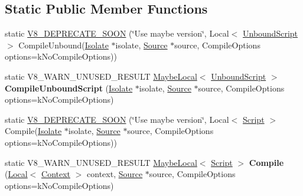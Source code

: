 \subsection*{Static Public Member Functions}
\begin{DoxyCompactItemize}
\item 
static \hyperlink{classv8_1_1_script_compiler_a092d08beb6c7c73e731197d0caf3abb3}{V8\+\_\+\+D\+E\+P\+R\+E\+C\+A\+T\+E\+\_\+\+S\+O\+O\+N} (\char`\"{}Use maybe version\char`\"{}, Local$<$ \hyperlink{classv8_1_1_unbound_script}{Unbound\+Script} $>$ Compile\+Unbound(\hyperlink{classv8_1_1_isolate}{Isolate} $\ast$isolate, \hyperlink{classv8_1_1_script_compiler_1_1_source}{Source} $\ast$source, Compile\+Options options=k\+No\+Compile\+Options))
\item 
\hypertarget{classv8_1_1_script_compiler_a4d3ed07e15d6ed5a5f569b44abc2cda9}{}static V8\+\_\+\+W\+A\+R\+N\+\_\+\+U\+N\+U\+S\+E\+D\+\_\+\+R\+E\+S\+U\+L\+T \hyperlink{classv8_1_1_maybe_local}{Maybe\+Local}$<$ \hyperlink{classv8_1_1_unbound_script}{Unbound\+Script} $>$ {\bfseries Compile\+Unbound\+Script} (\hyperlink{classv8_1_1_isolate}{Isolate} $\ast$isolate, \hyperlink{classv8_1_1_script_compiler_1_1_source}{Source} $\ast$source, Compile\+Options options=k\+No\+Compile\+Options)\label{classv8_1_1_script_compiler_a4d3ed07e15d6ed5a5f569b44abc2cda9}

\item 
static \hyperlink{classv8_1_1_script_compiler_a43c0f68d88fd3ce1a648e1f352797319}{V8\+\_\+\+D\+E\+P\+R\+E\+C\+A\+T\+E\+\_\+\+S\+O\+O\+N} (\char`\"{}Use maybe version\char`\"{}, Local$<$ \hyperlink{classv8_1_1_script}{Script} $>$ Compile(\hyperlink{classv8_1_1_isolate}{Isolate} $\ast$isolate, \hyperlink{classv8_1_1_script_compiler_1_1_source}{Source} $\ast$source, Compile\+Options options=k\+No\+Compile\+Options))
\item 
\hypertarget{classv8_1_1_script_compiler_a5bb0c5823fe340b0ad3fdfb595cea9a4}{}static V8\+\_\+\+W\+A\+R\+N\+\_\+\+U\+N\+U\+S\+E\+D\+\_\+\+R\+E\+S\+U\+L\+T \hyperlink{classv8_1_1_maybe_local}{Maybe\+Local}$<$ \hyperlink{classv8_1_1_script}{Script} $>$ {\bfseries Compile} (\hyperlink{classv8_1_1_local}{Local}$<$ \hyperlink{classv8_1_1_context}{Context} $>$ context, \hyperlink{classv8_1_1_script_compiler_1_1_source}{Source} $\ast$source, Compile\+Options options=k\+No\+Compile\+Options)\label{classv8_1_1_script_compiler_a5bb0c5823fe340b0ad3fdfb595cea9a4}


\end{DoxyCompactItemize}
